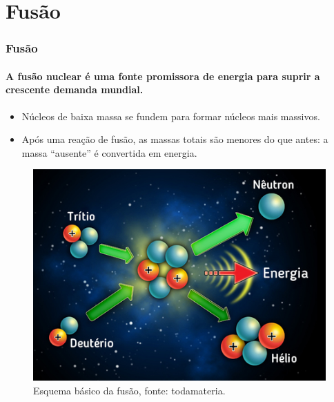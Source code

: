 \documentclass[aspectratio=169]{beamer}
\begin{document}
	\section{Fusão}
\begin{frame}
	   \frametitle{Fusão}
	   \framesubtitle{A fusão nuclear é uma fonte promissora de energia para suprir a crescente demanda mundial.}
		\begin{minipage}[H]{.4\textwidth}
		 \begin{itemize}

\item Núcleos de baixa massa se fundem para formar núcleos mais massivos.
\item Após uma reação de fusão, as massas totais são menores do que antes: a massa “ausente” é convertida em energia. \cite{tokamaks}

\end{itemize}
		\end{minipage}
		\hfill
		\begin{minipage}[h]{.45\textwidth}
			\begin{figure}
				\centering
				
\includegraphics[width=.8\linewidth]{fusaoimage.png}
\caption{Esquema básico da fusão, fonte: todamateria.}   
\end{figure}
		\end{minipage}
	\end{frame}


\end{document}
